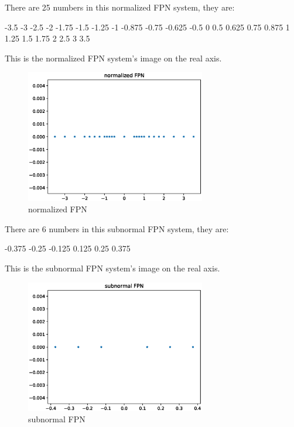 \documentclass[12]{article}%
\begin{document}
            There are 25 numbers in this normalized FPN system, they are:

            -3.5 -3 -2.5 -2 -1.75 -1.5 -1.25 -1 -0.875 -0.75 -0.625 -0.5 0 0.5 0.625 0.75 0.875 1 1.25 1.5 1.75 2 2.5 3 3.5
            
            This is the normalized FPN system's image on the real axis.
            \begin{figure}[H]
                \centering
                \includegraphics[width=0.7\textwidth]{./pic/B.eps}
                \caption{normalized FPN}
            \end{figure}

            There are 6 numbers in this subnormal FPN system, they are:

            -0.375 -0.25 -0.125 0.125 0.25 0.375 

            This is the subnormal FPN system's image on the real axis.
            \begin{figure}[H]
                \centering
                \includegraphics[width=0.7\textwidth]{./pic/sB.eps}
                \caption{subnormal FPN}
            \end{figure}
\end{document}
